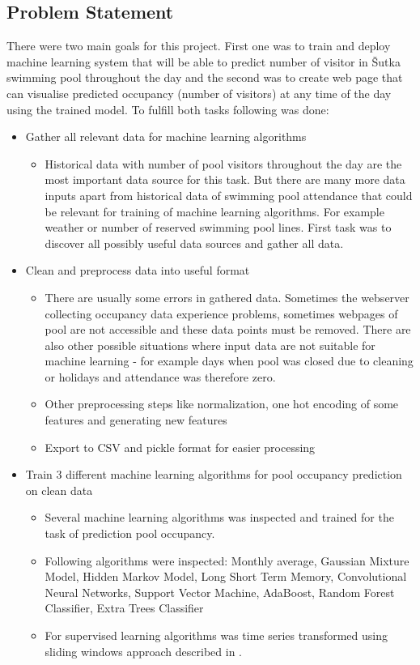 \documentclass{article}
\begin{document}
\subsection{Problem Statement} \label{sec:problem_statement}

There were two main goals for this project. First one was to train and deploy machine learning system that will be able to predict number of visitor in \v{S}utka swimming pool throughout the day and the second was to create web page that can visualise predicted occupancy (number of visitors) at any time of the day using the trained model. To fulfill both tasks following was done:

\begin{itemize}
\item Gather all relevant data for machine learning algorithms
\begin{itemize}
\item Historical data with number of pool visitors throughout the day are the most important data source for this task. But there are many more data inputs apart from historical data of swimming pool attendance that could be relevant for training of machine learning algorithms. For example weather or number of reserved swimming pool lines. First task was to discover all possibly useful data sources and gather all data.
\end{itemize}

\item Clean and preprocess data into useful format
\begin{itemize}
\item There are usually some errors in gathered data. Sometimes the webserver collecting occupancy data experience problems, sometimes webpages of pool are not accessible and these data points must be removed. There are also other possible situations where input data are not suitable for machine learning - for example days when pool was closed due to cleaning or holidays and attendance was therefore zero. 
\item Other preprocessing steps like normalization, one hot encoding of some features and generating new features
\item Export to CSV and pickle format for easier processing
\end{itemize}

\item Train 3 different machine learning algorithms for pool occupancy prediction on clean data
\begin{itemize}
\item Several machine learning algorithms was inspected and trained for the task of prediction pool occupancy. 
\item Following algorithms were inspected: Monthly average, Gaussian Mixture Model, Hidden Markov Model, Long Short Term Memory, Convolutional Neural Networks, Support Vector Machine, AdaBoost, Random Forest Classifier, Extra Trees Classifier
\item For supervised learning algorithms was time series transformed using sliding windows approach described in \citep{brownlee2019howtosupervised}.
\end{itemize}


\end{itemize}
\end{document}
